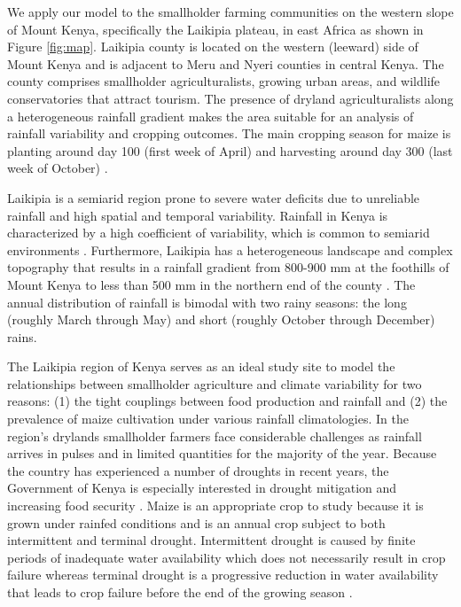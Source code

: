 
We apply our model to the smallholder farming communities on the western slope of Mount Kenya, specifically the Laikipia plateau, in east Africa as shown in Figure \ref{fig:map}. Laikipia county is located on the western (leeward) side of Mount Kenya and is adjacent to Meru and Nyeri counties in central Kenya. The county comprises smallholder agriculturalists, growing urban areas, and wildlife conservatories that attract tourism. The presence of dryland agriculturalists along a heterogeneous rainfall gradient makes the area suitable for an analysis of rainfall variability and cropping outcomes. The main cropping season for maize is planting around day 100 (first week of April) and harvesting around day 300 (last week of October) \cite{Ray2015}. %

Laikipia is a semiarid region prone to severe water deficits due to unreliable rainfall and high spatial and temporal variability. Rainfall in Kenya is characterized by a high coefficient of variability, which is common to semiarid environments \cite{herrero2010climate}. Furthermore, Laikipia has a heterogeneous landscape and complex topography that results in a rainfall gradient from 800-900 mm at the foothills of Mount Kenya to less than 500 mm in the northern end of the county \cite{wiesmann1998sustainable}. The annual distribution of rainfall is bimodal with two rainy seasons: the long (roughly March through May) and short (roughly October through December) rains. 

The Laikipia region of Kenya serves as an ideal study site to model the relationships between smallholder agriculture and climate variability for two reasons: (1) the tight couplings between food production and rainfall and (2) the prevalence of maize cultivation under various rainfall climatologies. In the region's drylands smallholder farmers face considerable challenges as rainfall arrives in pulses and in limited quantities for the majority of the year. Because the country has experienced a number of droughts in recent years, the Government of Kenya is especially interested in drought mitigation and increasing food security \cite{Kenya2010-jf}. Maize is an appropriate crop to study because it is grown under rainfed conditions and is an annual crop subject to both intermittent and terminal drought. Intermittent drought is caused by finite periods of inadequate water availability which does not necessarily result in crop failure whereas terminal drought is a progressive reduction in water availability that leads to crop failure before the end of the growing season \cite{neumann2008coping}.

